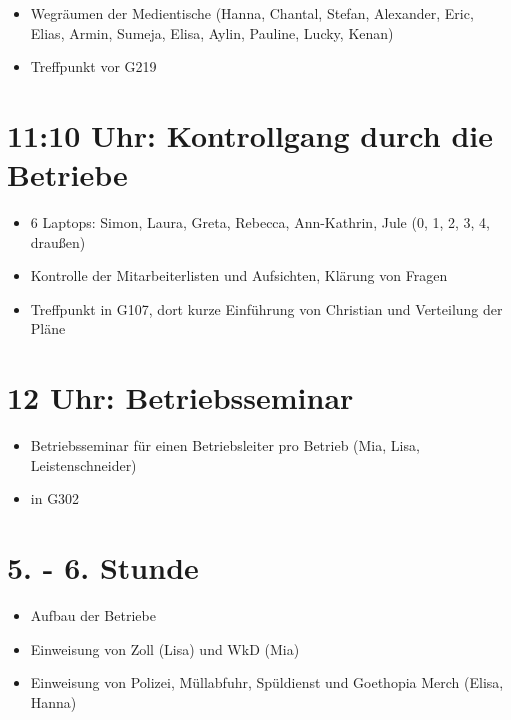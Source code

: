 \documentclass[12pt]{article}
\begin{document}
\begin{itemize}
    \setlength{\itemsep}{0pt}
    \item Wegräumen der Medientische (Hanna, Chantal, Stefan, Alexander, Eric, Elias, Armin,
        Sumeja, Elisa, Aylin, Pauline, Lucky, Kenan)
    \item Treffpunkt vor G219
\end{itemize}

\section*{11:10 Uhr: Kontrollgang durch die Betriebe}

\begin{itemize}
    \setlength{\itemsep}{0pt}
    \item 6 Laptops: Simon, Laura, Greta, Rebecca, Ann-Kathrin, Jule (0, 1, 2, 3, 4, draußen)
    \item Kontrolle der Mitarbeiterlisten und Aufsichten, Klärung von Fragen
    \item Treffpunkt in G107, dort kurze Einführung von Christian und Verteilung der Pläne
\end{itemize}

\section*{12 Uhr: Betriebsseminar}

\begin{itemize}
    \setlength{\itemsep}{0pt}
    \item Betriebsseminar für einen Betriebsleiter pro Betrieb (Mia, Lisa, Leistenschneider)
    \item in G302
\end{itemize}

\section*{5. - 6. Stunde}

\begin{itemize}
    \setlength{\itemsep}{0pt}
    \item Aufbau der Betriebe
    \item Einweisung von Zoll (Lisa) und WkD (Mia)
    \item Einweisung von Polizei, Müllabfuhr, Spüldienst und Goethopia Merch (Elisa, Hanna)
\end{itemize}
\end{document}

